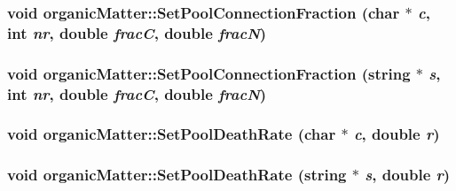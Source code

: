 \label{classorganic_matter_ad506c445be08af7d10c7173f2ea5fe9c}
\hypertarget{classorganic_matter_ad5c435634528672b927fbf347143afbe}{
\subsubsection[{SetPoolConnectionFraction}]{\setlength{\rightskip}{0pt plus 5cm}void organicMatter::SetPoolConnectionFraction (char $\ast$ {\em c}, \/  int {\em nr}, \/  double {\em fracC}, \/  double {\em fracN})}}
\label{classorganic_matter_ad5c435634528672b927fbf347143afbe}
\hypertarget{classorganic_matter_a0e64612ab5367f164ae298a50fde55c9}{
\subsubsection[{SetPoolConnectionFraction}]{\setlength{\rightskip}{0pt plus 5cm}void organicMatter::SetPoolConnectionFraction (string $\ast$ {\em s}, \/  int {\em nr}, \/  double {\em fracC}, \/  double {\em fracN})}}
\label{classorganic_matter_a0e64612ab5367f164ae298a50fde55c9}
\hypertarget{classorganic_matter_a320614cdcedb30be5562a96164b6002b}{
\subsubsection[{SetPoolDeathRate}]{\setlength{\rightskip}{0pt plus 5cm}void organicMatter::SetPoolDeathRate (char $\ast$ {\em c}, \/  double {\em r})}}
\label{classorganic_matter_a320614cdcedb30be5562a96164b6002b}
\hypertarget{classorganic_matter_a9570bf4f0f840b7d661575d7bf62a964}{
\subsubsection[{SetPoolDeathRate}]{\setlength{\rightskip}{0pt plus 5cm}void organicMatter::SetPoolDeathRate (string $\ast$ {\em s}, \/  double {\em r})}}
